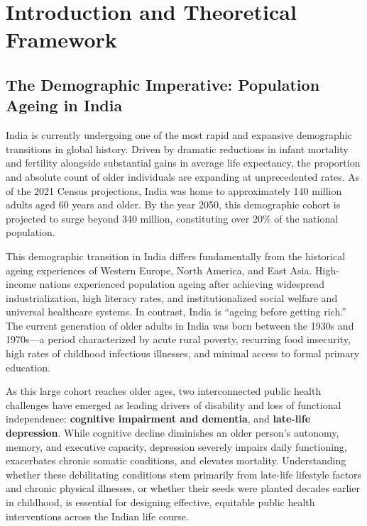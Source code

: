 
\section{Introduction and Theoretical Framework}

\subsection{The Demographic Imperative: Population Ageing in India}
India is currently undergoing one of the most rapid and expansive demographic transitions in global history. Driven by dramatic reductions in infant mortality and fertility alongside substantial gains in average life expectancy, the proportion and absolute count of older individuals are expanding at unprecedented rates. As of the 2021 Census projections, India was home to approximately 140 million adults aged 60 years and older. By the year 2050, this demographic cohort is projected to surge beyond 340 million, constituting over 20\% of the national population. 

This demographic transition in India differs fundamentally from the historical ageing experiences of Western Europe, North America, and East Asia. High-income nations experienced population ageing after achieving widespread industrialization, high literacy rates, and institutionalized social welfare and universal healthcare systems. In contrast, India is ``ageing before getting rich.'' The current generation of older adults in India was born between the 1930s and 1970s—a period characterized by acute rural poverty, recurring food insecurity, high rates of childhood infectious illnesses, and minimal access to formal primary education. 

As this large cohort reaches older ages, two interconnected public health challenges have emerged as leading drivers of disability and loss of functional independence: \textbf{cognitive impairment and dementia}, and \textbf{late-life depression}. While cognitive decline diminishes an older person's autonomy, memory, and executive capacity, depression severely impairs daily functioning, exacerbates chronic somatic conditions, and elevates mortality. Understanding whether these debilitating conditions stem primarily from late-life lifestyle factors and chronic physical illnesses, or whether their seeds were planted decades earlier in childhood, is essential for designing effective, equitable public health interventions across the Indian life course.

